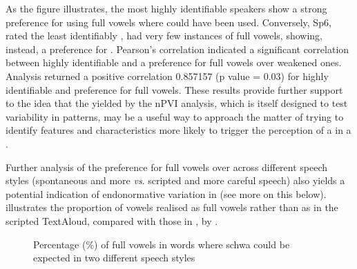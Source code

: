 \documentclass[output=paper]{langsci/langscibook}
\begin{document}
As the figure illustrates, the most highly identifiable  speakers show a strong preference for using full vowels where  could have been used. Conversely, Sp6, rated the least identifiably  , had very few instances of full vowels, showing, instead, a preference for . Pearson's correlation indicated a significant correlation between highly identifiable  and a preference for full vowels over weakened ones. Analysis returned a positive correlation 0.857157  (p value = 0.03) for highly identifiable  and preference for full vowels. These results provide further support to the idea that the  yielded by the nPVI analysis, which is itself designed to test variability in  patterns, may be a useful way to approach the matter of trying to identify features and characteristics more likely to trigger the perception of a   in a . 


Further analysis of the preference for full vowels over  across different speech styles (spontaneous and more  \textit{vs}. scripted and more careful speech) also yields a potential indication of endonormative variation in  (see more on this below).  illustrates the proportion of vowels realised as full vowels rather than as  in the scripted TextAloud, compared with those in , by .


\begin{figure} %
  \caption{\label{fig:key:grech4}Percentage (\%) of full vowels in words where schwa could be expected in two different speech styles}
  
\end{figure}
\end{document}
